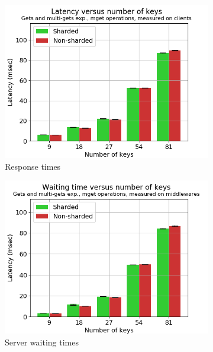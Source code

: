 \documentclass[11pt,a4paper]{article}
\begin{document}
\begin{figure}[h]
\begin{subfigure}{.5\textwidth}
  \centering
  \includegraphics[width=1.0\linewidth ,trim={5px 0px 20px 0px},clip]{img/plot/gmg-extra-mget-lat_cli.png}
  \caption{Response times}
  \label{fig:gmg-extra-mget-lat_cli}
\end{subfigure}%
\begin{subfigure}{.5\textwidth}
  \centering
  \includegraphics[width=1.0\linewidth ,trim={5px 0px 20px 0px},clip]{img/plot/gmg-extra-mget-wtime_mw.png}
  \caption{Server waiting times}
  \label{fig:gmg-extra-mget-wtime_mw}
\end{subfigure}
\begin{subfigure}{.5\textwidth}

\end{subfigure}
\end{figure}
\end{document}
